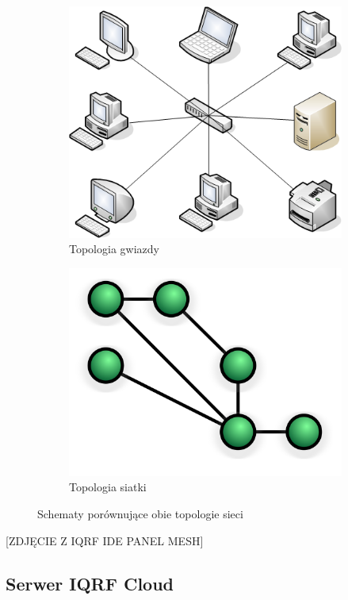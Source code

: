 \begin{figure}[H]

\centering
\begin{subfigure}{0.4\textwidth}
    \centering
    \includegraphics[width=0.8\linewidth]{zdj/star-top.png}
    \caption{Topologia gwiazdy \cite{fig-star-top}}
\end{subfigure}
\begin{subfigure}{0.4\textwidth}
    \centering
    \includegraphics[width=0.8\linewidth]{zdj/mesh-top.png}
    \caption{Topologia siatki \cite{fig-mesh-top}}
\end{subfigure}
   
\caption{Schematy porównujące obie topologie sieci}

\end{figure}

[ZDJĘCIE Z IQRF IDE PANEL MESH]

\subsection{Serwer IQRF Cloud}

